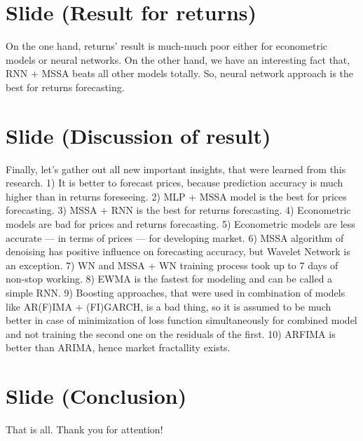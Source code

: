\documentclass[a4paper, 12pt]{article}
\begin{document}
	\section{Slide (Result for returns)}
		On the one hand, returns' result is much-much poor either for econometric models or neural networks. On the other hand, we have an interesting fact that, RNN + MSSA beats all other models totally. So, neural network approach is the best for returns forecasting.
	\section{Slide (Discussion of result)}
		Finally, let's gather out all new important insights, that were learned from this research. 1) It is better to forecast prices, because prediction accuracy is much higher than in returns foreseeing. 2) MLP + MSSA model is the best for prices forecasting. 3) MSSA + RNN is the best for returns forecasting. 4) Econometric models are bad for prices and returns forecasting. 5) Econometric models are less accurate --- in terms of prices --- for developing market. 6) MSSA algorithm of denoising has positive influence on forecasting accuracy, but Wavelet Network is an exception. 7) WN and MSSA + WN training process took up to 7 days of non-stop working. 8) EWMA is the fastest for modeling and can be called a simple RNN. 9) Boosting approaches, that were used in combination of models like AR(F)IMA + (FI)GARCH, is a bad thing, so it is assumed to be much better in case of minimization of loss function simultaneously for combined model and not training the second one on the residuals of the first. 10) ARFIMA is better than ARIMA, hence market fractallity exists. 
	\section{Slide (Conclusion)}
		That is all. Thank you for attention!
\end{document}
